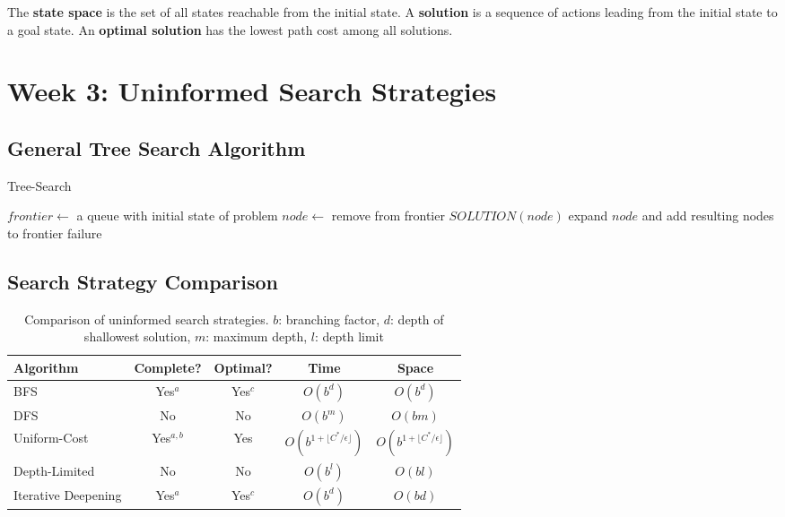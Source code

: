 \documentclass[11pt,letterpaper]{article}
\begin{document}
\begin{important}
The \textbf{state space} is the set of all states reachable from the initial state. A \textbf{solution} is a sequence of actions leading from the initial state to a goal state. An \textbf{optimal solution} has the lowest path cost among all solutions.
\end{important}

\section{Week 3: Uninformed Search Strategies}

\subsection{General Tree Search Algorithm}

\begin{algorithm}
\caption{Tree-Search}
\begin{algorithmic}[1]
    \State $frontier \gets$ a queue with initial state of problem
        \State $node \gets$ remove from frontier
            \State \Return $SOLUTION(node)$
        \EndIf
        \State expand $node$ and add resulting nodes to frontier
    \EndWhile
    \State \Return failure
\EndFunction
\end{algorithmic}
\end{algorithm}

\subsection{Search Strategy Comparison}

\begin{table}[h]
\centering
\begin{tabular}{|l|c|c|c|c|}
\hline
\textbf{Algorithm} & \textbf{Complete?} & \textbf{Optimal?} & \textbf{Time} & \textbf{Space} \\
\hline
BFS & Yes$^a$ & Yes$^c$ & $O(b^d)$ & $O(b^d)$ \\
\hline
DFS & No & No & $O(b^m)$ & $O(bm)$ \\
\hline
Uniform-Cost & Yes$^{a,b}$ & Yes & $O(b^{1+\lfloor C^*/\epsilon \rfloor})$ & $O(b^{1+\lfloor C^*/\epsilon \rfloor})$ \\
\hline
Depth-Limited & No & No & $O(b^l)$ & $O(bl)$ \\
\hline
Iterative Deepening & Yes$^a$ & Yes$^c$ & $O(b^d)$ & $O(bd)$ \\
\hline
\end{tabular}
\caption{Comparison of uninformed search strategies. $b$: branching factor, $d$: depth of shallowest solution, $m$: maximum depth, $l$: depth limit}
\end{table}
\end{document}
